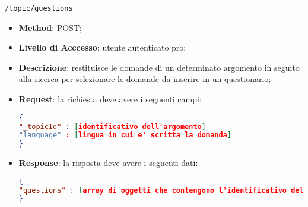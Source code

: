 \item \texttt{/topic/questions}
		\begin{itemize}
			\item \textbf{Method}: POST;
			\item \textbf{Livello di Acccesso}: utente autenticato pro;
			\item \textbf{Descrizione}: restituisce le domande di un determinato argomento in seguito alla ricerca per selezionare le domande da inserire in un questionario;
			\item \textbf{Request}: la richiesta deve avere i seguenti campi:
\begin{lstlisting}[language=json,firstnumber=1]
{
"_topicId" : [identificativo dell'argomento]
"language" : [lingua in cui e' scritta la domanda]
}
\end{lstlisting}
			\item \textbf{Response}: la risposta deve avere i seguenti dati:
\begin{lstlisting}[language=json,firstnumber=1]
{
"questions" : [array di oggetti che contengono l'identificativo delle domande e l'username dell'autore]
}
\end{lstlisting}
		\end{itemize}